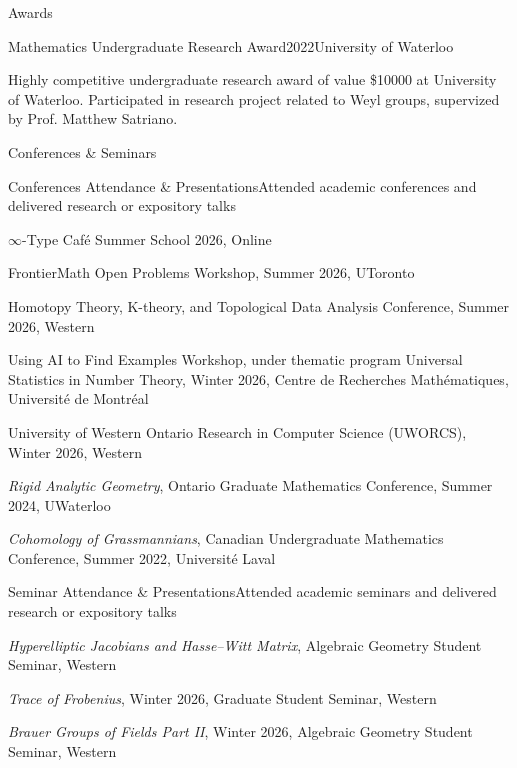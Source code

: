 \documentclass{resume}
\begin{document}
\vspace{0.55em}
\begin{rSection}{Awards}
\begin{rSubsection}{Mathematics Undergraduate Research Award}{2022}{University of Waterloo}{}
\item Highly competitive undergraduate research award of value \$10000 at University of Waterloo. Participated in research project related to Weyl groups, supervized by Prof. Matthew Satriano.
\end{rSubsection}
\end{rSection}
\vspace{0.25em}

\begin{rSection}{Conferences \& Seminars} \itemsep -3pt
\begin{rSubsection}{Conferences Attendance \& Presentations}{}{Attended academic conferences and delivered research or expository talks}{}
\item $\infty$-Type Café Summer School 2026, Online 
\item FrontierMath Open Problems Workshop,  Summer 2026, UToronto
\item Homotopy Theory, K-theory, and Topological Data Analysis Conference, Summer 2026, Western
\item Using AI to Find Examples Workshop, under thematic program Universal Statistics in Number Theory, Winter 2026, Centre de Recherches Mathématiques, Université de Montréal
\item University of Western Ontario Research in Computer Science (UWORCS), Winter 2026, Western
\item {\em Rigid Analytic Geometry}, Ontario Graduate Mathematics Conference,  Summer 2024, UWaterloo
\item {\em Cohomology of Grassmannians}, Canadian Undergraduate Mathematics Conference, Summer 2022, Université Laval
\end{rSubsection}
\begin{rSubsection}{Seminar Attendance \& Presentations}{}{Attended academic seminars and delivered research or expository talks}{}
    \item {\em Hyperelliptic Jacobians and Hasse–Witt Matrix}, Algebraic Geometry Student Seminar, Western
    \item {\em Trace of Frobenius}, Winter 2026, Graduate Student Seminar, Western
    \item {\em Brauer Groups of Fields Part II}, Winter 2026, Algebraic Geometry Student Seminar, Western

\end{rSubsection}
\end{rSection}
\end{document}
